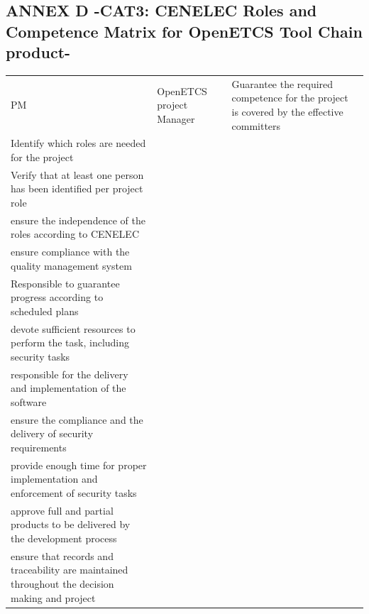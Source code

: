 \documentclass{template/openetcs_article}
\begin{document}
\begin{landscape}
\newpage


\subsection{ANNEX D -CAT3: CENELEC Roles and Competence Matrix for OpenETCS Tool Chain product-}

\begin{flushleft}
\begin{supertabular}[H]{|m{1cm}|m{2,5cm}|m{15cm}|m{6cm}|}
\hline
PM &
OpenETCS project Manager &
\raggedright
Guarantee the required competence for the project is covered by the effective committers\\
Identify which roles are needed for the project\\
Verify that at least one person has been identified per project role\\
ensure the independence of the roles according to CENELEC\\
ensure compliance with the quality management system\\
Responsible to guarantee progress according to scheduled plans\\
devote sufficient resources to perform the task, including security tasks\\
responsible for the delivery and implementation of the software\\
ensure the compliance and the delivery of security requirements\\
provide enough time for proper implementation and enforcement of security tasks\\
approve full and partial products to be delivered by the development process\\
ensure that records and traceability are maintained throughout the decision making and project\\

\end{supertabular}
\end{flushleft}
\end{landscape}
\end{document}
